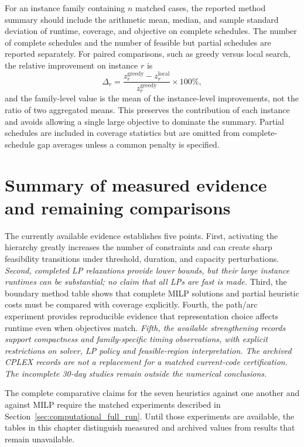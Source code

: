 For an instance family containing $n$ matched cases, the reported method
summary should include the arithmetic mean, median, and sample standard
deviation of runtime, coverage, and objective on complete schedules. The number
of complete schedules and the number of feasible but partial schedules are
reported separately. For paired comparisons, such as greedy versus local
search, the relative improvement on instance $r$ is
\begin{equation}
  \Delta_r =
  \frac{z_r^{\mathrm{greedy}}-z_r^{\mathrm{local}}}
     {z_r^{\mathrm{greedy}}}\times 100\%,
\end{equation}
and the family-level value is the mean of the instance-level improvements,
not the ratio of two aggregated means. This preserves the contribution of
each instance and avoids allowing a single large objective to dominate the
summary. Partial schedules are included in coverage statistics but are omitted
from complete-schedule gap averages unless a common penalty is specified.

\section{Summary of measured evidence and remaining comparisons}
\label{sec:computational_summary}

The currently available evidence establishes five points. First, activating
the hierarchy greatly increases the number of constraints and can create sharp
feasibility transitions under threshold, duration, and capacity perturbations.
\textit{Second, completed LP relaxations provide lower bounds, but their large
instance runtimes can be substantial; no claim that all LPs are fast is made.}
Third, the boundary method table
shows that complete MILP solutions and partial heuristic costs must be compared
with coverage explicitly. Fourth, the path/arc experiment provides reproducible
evidence that representation choice affects runtime even when objectives match.
\textit{Fifth, the available strengthening records support compactness and
family-specific timing observations, with explicit restrictions on solver,
LP policy and feasible-region interpretation. The archived CPLEX records are
not a replacement for a matched current-code certification. The incomplete
30-day studies remain outside the numerical conclusions.}

The complete comparative claims for the seven heuristics against one another
and against MILP require the matched experiments described in
Section~\ref{sec:computational_full_run}. Until those experiments are available,
the tables in this chapter distinguish measured and archived values from
results that remain unavailable.

